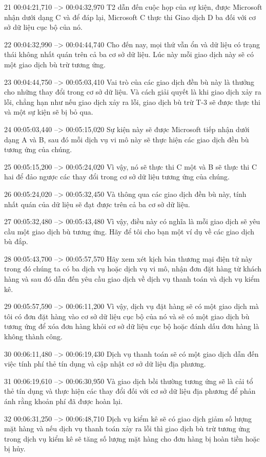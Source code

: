 21
00:04:21,710 --> 00:04:32,970
T2 dẫn đến cuộc họp của sự kiện, được Microsoft nhận dưới dạng C và để đáp lại, Microsoft C thực thi Giao dịch D ba đối với cơ sở dữ liệu cục bộ của nó.

22
00:04:32,990 --> 00:04:44,740
Cho đến nay, mọi thứ vẫn ổn và dữ liệu có trạng thái không nhất quán trên cả ba cơ sở dữ liệu.  Lúc này mỗi giao dịch này sẽ có một giao dịch bù trừ tương ứng.

23
00:04:44,750 --> 00:05:03,410
Vai trò của các giao dịch đền bù này là thưởng cho những thay đổi trong cơ sở dữ liệu.  Và cách giải quyết là khi giao dịch xảy ra lỗi, chẳng hạn như nếu giao dịch xảy ra lỗi, giao dịch bù trừ T-3 sẽ được thực thi và một sự kiện sẽ bị bỏ qua.

24
00:05:03,440 --> 00:05:15,020
Sự kiện này sẽ được Microsoft tiếp nhận dưới dạng A và B, sau đó mỗi dịch vụ vi mô này sẽ thực hiện các giao dịch đền bù tương ứng của chúng.

25
00:05:15,200 --> 00:05:24,020
Vì vậy, nó sẽ thực thi C một và B sẽ thực thi C hai để đảo ngược các thay đổi trong cơ sở dữ liệu tương ứng của chúng.

26
00:05:24,020 --> 00:05:32,450
Và thông qua các giao dịch đền bù này, tính nhất quán của dữ liệu sẽ đạt được trên cả ba cơ sở dữ liệu.

27
00:05:32,480 --> 00:05:43,480
Vì vậy, điều này có nghĩa là mỗi giao dịch sẽ yêu cầu một giao dịch bù tương ứng.  Hãy để tôi cho bạn một ví dụ về các giao dịch bù đắp.

28
00:05:43,700 --> 00:05:57,570
Hãy xem xét kịch bản thương mại điện tử này trong đó chúng ta có ba dịch vụ hoặc dịch vụ vi mô, nhận đơn đặt hàng từ khách hàng và sau đó dẫn đến yêu cầu giao dịch về dịch vụ thanh toán và dịch vụ kiểm kê.

29
00:05:57,590 --> 00:06:11,200
Vì vậy, dịch vụ đặt hàng sẽ có một giao dịch mà tôi có đơn đặt hàng vào cơ sở dữ liệu cục bộ của nó và sẽ có một giao dịch bù tương ứng để xóa đơn hàng khỏi cơ sở dữ liệu cục bộ hoặc đánh dấu đơn hàng là không thành công.

30
00:06:11,480 --> 00:06:19,430
Dịch vụ thanh toán sẽ có một giao dịch dẫn đến việc tính phí thẻ tín dụng và cập nhật cơ sở dữ liệu địa phương.

31
00:06:19,610 --> 00:06:30,950
Và giao dịch bồi thường tương ứng sẽ là cải tổ thẻ tín dụng và thực hiện các thay đổi đối với cơ sở dữ liệu địa phương để phản ánh rằng khoản phí đã được hoàn lại.

32
00:06:31,250 --> 00:06:48,710
Dịch vụ kiểm kê sẽ có giao dịch giảm số lượng mặt hàng và nếu dịch vụ thanh toán xảy ra lỗi thì giao dịch bù trừ tương ứng trong dịch vụ kiểm kê sẽ tăng số lượng mặt hàng cho đơn hàng bị hoàn tiền hoặc bị hủy.

